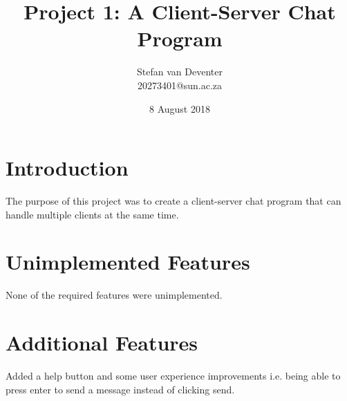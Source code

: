\documentclass{article}
\title{Project 1: A Client-Server Chat Program}
\author{Stefan van Deventer \\  20273401@sun.ac.za}
\date{8 August 2018}
\begin{document}
\maketitle

\section{Introduction}
The purpose of this project was to create a client-server chat program that can handle multiple clients 
at the same time.

\section{Unimplemented Features}
None of the required features were unimplemented.

\section{Additional Features}
Added a help button and some user experience improvements i.e. being able to press enter to send a message instead of clicking send.
\end{document}
